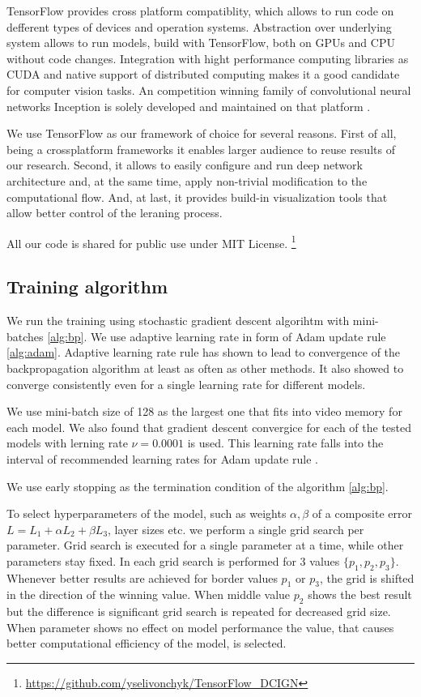 TensorFlow provides cross platform compatiblity, which allows to run code on defferent types of devices and operation systems.
Abstraction over underlying system allows to run models, build with TensorFlow, both on GPUs and CPU without code changes.
Integration with hight performance computing libraries as CUDA \cite{Nickolls2008} and native support of distributed computing makes it a good candidate for computer vision tasks.
An competition winning family of convolutional neural networks Inception is solely developed and maintained on that platform \cite{Szegedy2016}.

We use TensorFlow as our framework of choice for several reasons.
First of all, being a crossplatform frameworks it enables larger audience to reuse results of our research.
Second, it allows to easily configure and run deep network architecture and, at the same time, apply non-trivial modification to the computational flow.
And, at last, it provides build-in visualization tools that allow better control of the leraning process.

All our code is shared for public use under MIT License.
\footnote{\url{https://github.com/yselivonchyk/TensorFlow_DCIGN}}

\subsection{Training algorithm}

We run the training using stochastic gradient descent algorihtm with mini-batches \ref{alg:bp}. We use adaptive learning rate in form of Adam update rule \ref{alg:adam}. Adaptive learning rate rule has shown to lead to convergence of the backpropagation algorithm at least as often as other methods. It also showed to converge consistently even for a single learning rate for different models.

We use mini-batch size of 128 as the largest one that fits into video memory for each model.
We also found that gradient descent convergice for each of the tested models with lerning rate $\nu=0.0001$ is used. This learning rate falls into the interval of recommended learning rates for Adam update rule \cite{Kingma2015}.

We use early stopping as the termination condition of the algorithm \ref{alg:bp}.

To select hyperparameters of the model, such as weights $\alpha, \beta$ of a composite error $L=L_1 + \alpha L_2 + \beta L_3$, layer sizes etc. we perform a single grid search per parameter.
Grid search is executed for a single parameter at a time, while other parameters stay fixed.
In each grid search is performed for 3 values $\{p_1, p_2, p_3\}$. Whenever better results are achieved for border values $p_1$ or $p_3$, the grid is shifted in the direction of the winning value. When middle value $p_2$ shows the best result but the difference is significant grid search is repeated for decreased grid size.
When parameter shows no effect on model performance the value, that causes better computational efficiency of the model, is selected.


